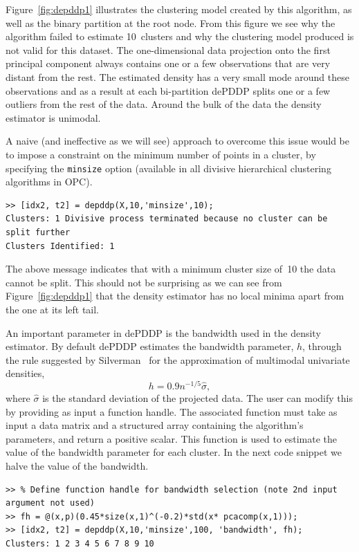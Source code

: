 \documentclass{book}
\begin{document}
Figure~\ref{fig:depddp1} illustrates the clustering model created by this
algorithm, as well as the binary partition at the root node. From this figure
we see why the algorithm failed to estimate 10~clusters and why the clustering
model produced is not valid for this dataset.
%
The one-dimensional data projection onto the first principal component 
always contains one or a few
observations that are very distant from the rest. The estimated density
has a very small mode around these observations and as a result at each
bi-partition dePDDP splits one or a few outliers from the rest of the
data. Around the bulk of the data the density estimator is unimodal.

A naive (and ineffective as we will see) approach to overcome this issue would be to impose
a constraint on the minimum number of points in a cluster,
by specifying the {\tt minsize} option 
(available in all divisive hierarchical clustering algorithms in OPC).

\begin{verbatim}
>> [idx2, t2] = depddp(X,10,'minsize',10);
Clusters: 1 Divisive process terminated because no cluster can be split further
Clusters Identified: 1
\end{verbatim}

\noindent
%
The above message indicates that with a minimum cluster size of~10 the
data cannot be split.
%
This should not be surprising as we can see from Figure~\ref{fig:depddp1}
that the density estimator has no local minima apart from the one at its left tail.


An important parameter in dePDDP is the bandwidth used in the density
estimator. By default dePDDP estimates the bandwidth
parameter, $h$, through the rule suggested by Silverman~\cite{Silverman1986}
for the approximation of multimodal univariate densities,
%
\[
h = 0.9 n^{-1/5} \hat{\sigma}, 
\]
%
where $\hat{\sigma}$ is the standard deviation of the projected data.
%
The user can modify this by providing as input a function handle.
The associated function must take as input a data matrix and a structured array
containing the algorithm's parameters, and return a positive scalar. This function
is used to estimate the value of the bandwidth parameter for each cluster.
In the next code snippet we halve the value of the bandwidth.

\begin{verbatim}
>> % Define function handle for bandwidth selection (note 2nd input argument not used)
>> fh = @(x,p)(0.45*size(x,1)^(-0.2)*std(x* pcacomp(x,1)));
>> [idx2, t2] = depddp(X,10,'minsize',100, 'bandwidth', fh);
Clusters: 1 2 3 4 5 6 7 8 9 10
\end{verbatim}
%
\end{document}
